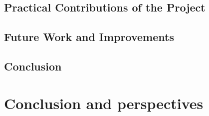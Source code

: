 \documentclass[12pt,a4paper,oneside,english]{book}
\begin{document}
\section{Practical Contributions of the Project}
\section{Future Work and Improvements}















\renewcommand{\bibname}{References}
\renewcommand{\bibsection}{\chapter{\bibname}}


\newpage



\section*{Conclusion}

\chapter*{Conclusion and perspectives}
\end{document}
